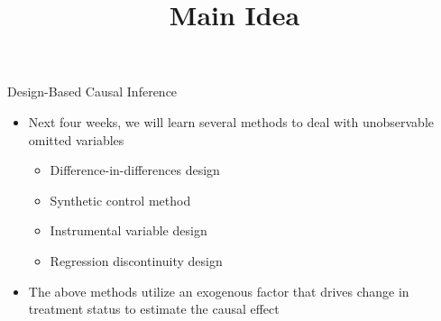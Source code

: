 \documentclass[dvipsnames,hyperref={pdfpagelabels=false}]{beamer}
\begin{document}
\begin{frame}{Design-Based Causal Inference}

\begin{itemize}

\item Next four weeks, we will learn several methods to deal with unobservable omitted variables
\vspace{0.2cm}
\begin{itemize}
\item Difference-in-differences design
\vspace{0.2cm}
\item Synthetic control method 
	\vspace{0.2cm}
\item Instrumental variable design
\vspace{0.2cm}
\item Regression discontinuity design
	

\end{itemize}
\vspace{0.2cm}
\item The above methods utilize an exogenous factor that drives change in treatment status to estimate the causal effect		






\end{itemize}

\end{frame}




\title[]  
{Main Idea}


\author 
{}

\institute{}






\date
{}
\end{document}
